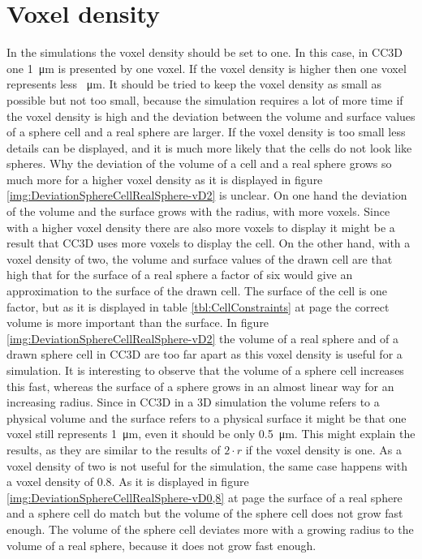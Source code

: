 \section{Voxel density}\label{sec:vD}
In the simulations the voxel density should be set to one. In this case, in \ac{CC3D} one \SI{1}{\micro\metre} is presented by one voxel. If the voxel density is higher then one voxel represents less \SI{}{\micro\metre}. It should be tried to keep the voxel density as small as possible but not too small, because the simulation requires a lot of more time if the voxel density is high and the deviation between the volume and surface values of a sphere cell and a real sphere are larger. If the voxel density is too small less details can be displayed, and it is much more likely that the cells do not look like spheres. Why the deviation of the volume of a cell and a real sphere grows so much more for a higher voxel density as it is displayed in figure \ref{img:DeviationSphereCellRealSphere-vD2} is unclear. \newline
On one hand the deviation of the volume and the surface grows with the radius, with more voxels. Since with a higher voxel density there are also more voxels to display it might be a result that \ac{CC3D} uses more voxels to display the cell. On the other hand, with a voxel density of two, the volume and surface values of the drawn cell are that high that for the surface of a real sphere a factor of six would give an approximation to the surface of the drawn cell. \newline
The surface of the cell is one factor, but as it is displayed in table \ref{tbl:CellConstraints} at page \pageref{tbl:CellConstraints} the correct volume is more important than the surface. In figure \ref{img:DeviationSphereCellRealSphere-vD2} the volume of a real sphere and of a drawn sphere cell in \ac{CC3D} are too far apart as this voxel density is useful for a simulation. It is interesting to observe that the volume of a sphere cell increases this fast, whereas the surface of a sphere grows in an almost linear way for an increasing radius. Since in \ac{CC3D} in a 3D simulation the volume refers to a physical volume and the surface refers to a physical surface it might be that one voxel still represents \SI{1}{\micro\metre}, even it should be only \SI{0.5}{\micro\metre}. This might explain the results, as they are similar to the results of $2 \cdot r$ if the voxel density is one. \newline
As a voxel density of two is not useful for the simulation, the same case happens with a voxel density of $0.8$. As it is displayed in figure \ref{img:DeviationSphereCellRealSphere-vD0,8} at page \pageref{img:DeviationSphereCellRealSphere-vD0,8} the surface of a real sphere and a sphere cell do match but the volume of the sphere cell does not grow fast enough. The volume of the sphere cell deviates more with a growing radius to the volume of a real sphere, because it does not grow fast enough. \newline
